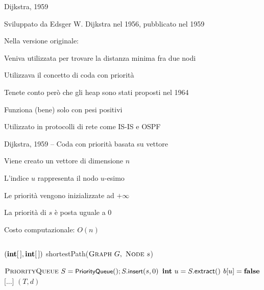 \begin{frame}{Dijkstra, 1959}

\vspace{-9pt}
\begin{myboxtitle}[Storia]
\BIL
\item Sviluppato da Edsger W. Dijkstra nel 1956, pubblicato nel 1959
\item Nella versione originale:
  \BI
  \item Veniva utilizzata per trovare la distanza minima fra due nodi
  \item Utilizzava il concetto di coda con priorità
  \item Tenete conto però che gli heap sono stati proposti nel 1964
  \EI
\EIL
\end{myboxtitle}

\begin{myboxtitle}[Note]
\BIL
\item Funziona (bene) solo con pesi positivi
\item Utilizzato in protocolli di rete come IS-IS e OSPF
\EIL
\end{myboxtitle}

\end{frame}


\begin{frame}{Dijkstra, 1959 -- Coda con priorità basata su vettore}

\vspace{-9pt}
\begin{myboxtitle}
\BI
\item Viene creato un vettore di dimensione $n$
\item L'indice $u$ rappresenta il nodo $u$-esimo
\item Le priorità vengono inizializzate ad $+\infty$
\item La priorità di $s$ è posta uguale a $0$
\item Costo computazionale: $O(n)$
\EI
\end{myboxtitle}

\vspace{-18pt}
\begin{columns}
\small
\begin{Procedure}
\caption[A]{$(\INTARRAY, \INTARRAY)$ \textsf{shortestPath}($\textsc{Graph}\ G,\ \textsc{Node}\ s$)}
\alert{$\textsc{PriorityQueue}\ S = \textsf{{\small PriorityQueue}}(); S.\textsf{{\small insert}}(s, 0)$}\;
{
  $\INTEGER\ u = S.\textsf{extract}()$\;
  $b[u] = \FALSE$\;
  {
    {
      [...]
    }
  }
}
\Return $(T,d)$
\end{Procedure}
\end{columns}




\end{frame}


